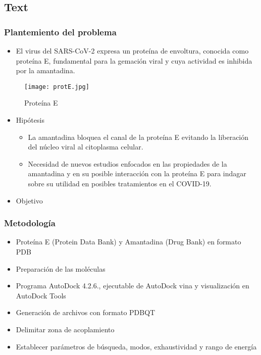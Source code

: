 \documentclass{beamer}
\begin{document}
\subsection{Text}
\begin{frame}
\frametitle{Plantemiento del problema}
\begin{itemize}
\item El virus del SARS-CoV-2 expresa un proteína de envoltura, conocida como proteína E, fundamental para la gemación viral y cuya actividad es inhibida por la amantadina.
\end{itemize}

\begin{figure}
    \centering
    \texttt{[image: protE.jpg]}
    \caption{Proteína E}
    \label{fig:protE}
\end{figure}
    \end{frame}


\begin{frame}
\begin{itemize}
\item Hipótesis
	\begin{itemize}
	\item La amantadina bloquea el canal de la proteína E evitando la liberación del núcleo viral al citoplasma celular.
	\item Necesidad de nuevos estudios enfocados en las propiedades de la amantadina y en su posible interacción con la proteína E para indagar sobre su utilidad en posibles tratamientos en el COVID-19.
	\end{itemize}
\item Objetivo
\end{itemize}
\end{frame}

\begin{frame}
\frametitle{Metodología}
\begin{itemize}
\item Proteína E (Protein Data Bank) y Amantadina (Drug Bank) en formato PDB
\item Preparación de las moléculas
\item Programa AutoDock 4.2.6., ejecutable de AutoDock vina y visualización en AutoDock Tools
\item Generación de archivos con formato PDBQT
\item Delimitar zona de acoplamiento
\item Establecer parámetros de búsqueda, modos, exhaustividad y rango de energía 
\end{itemize}
\end{frame}
\end{document}
